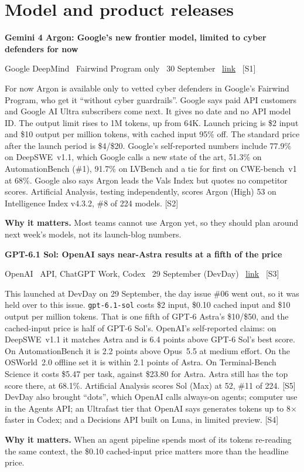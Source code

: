 \documentclass[11pt,a4paper]{article}
\newcommand{\entry}[4]{%
  \par\vspace{0.7em}%
  {\sffamily\bfseries\color{brandink}#1}\par
  {\footnotesize\color{brandgrey}#2 \textbullet\ \href{#3}{link} \textbullet\ \srcref{#4}}\par
  \vspace{0.15em}}
\newcommand{\why}[1]{\par{\small\textbf{Why it matters.} #1}\par}
\newcommand{\srcref}[1]{\textcolor{brandaccent}{[S#1]}}
\begin{document}
\section{Model and product releases}

\entry{Gemini 4 Argon: Google's new frontier model, limited to cyber defenders for now}{Google DeepMind \textbullet\ Fairwind Program only \textbullet\ 30 September}{https://blog.google/innovation-and-ai/models-and-research/gemini-models/gemini-4-argon/}{1}
For now Argon is available only to vetted cyber defenders in Google's Fairwind Program,
who get it ``without cyber guardrails''. Google says paid API customers and Google AI
Ultra subscribers come next. It gives no date and no API model ID. The output limit rises
to 1M tokens, up from 64K. Launch pricing is \$2 input and \$10 output per million tokens,
with cached input 95\% off. The standard price after the launch period is \$4/\$20.
Google's self-reported numbers include 77.9\% on DeepSWE~v1.1, which Google calls a new
state of the art, 51.3\% on AutomationBench (\#1), 91.7\% on LVBench and a tie for first on
CWE-bench~v1 at 68\%. Google also says Argon leads the Vals Index but quotes no competitor
scores. Artificial Analysis, testing independently, scores Argon (High) 53 on Intelligence
Index v4.3.2, \#8 of 224 models. \srcref{2}
\why{Most teams cannot use Argon yet, so they should plan around next week's models, not its launch-blog numbers.}

\entry{GPT-6.1 Sol: OpenAI says near-Astra results at a fifth of the price}{OpenAI \textbullet\ API, ChatGPT Work, Codex \textbullet\ 29 September (DevDay)}{https://openai.com/index/introducing-gpt-6-1-sol/}{3}
This launched at DevDay on 29 September, the day issue \#06 went out, so it was held over to
this issue. \texttt{gpt-6.1-sol} costs \$2 input, \$0.10 cached input and \$10 output per
million tokens. That is one fifth of GPT-6 Astra's \$10/\$50, and the cached-input price is
half of GPT-6 Sol's. OpenAI's self-reported claims: on DeepSWE~v1.1 it matches Astra and is
6.4 points above GPT-6 Sol's best score. On AutomationBench it is 2.2 points above Opus~5.5 at
medium effort. On the OSWorld~2.0 offline set it is within 2.1 points of Astra. On
Terminal-Bench Science it costs \$5.47 per task, against \$23.80 for Astra. Astra still has
the top score there, at 68.1\%. Artificial Analysis scores Sol (Max) at 52, \#11 of 224. \srcref{5}
DevDay also brought ``dots'', which OpenAI calls always-on agents; computer use in the Agents API;
an Ultrafast tier that OpenAI says generates tokens up to 8$\times$ faster in Codex; and a
Decisions API built on Luna, in limited preview. \srcref{4}
\why{When an agent pipeline spends most of its tokens re-reading the same context, the \$0.10 cached-input price matters more than the headline price.}
\end{document}
